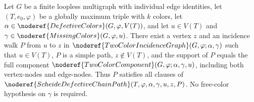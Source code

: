 \begin{helper}
Let $G$ be a finite loopless multigraph with individual edge identities,
let $(T,e_0,\varphi)$ be a globally maximum triple with $k$ colors,
let $\alpha\in\noderef{DefectiveColors}(G,\varphi,V(T))$, and let
$u\in V(T)$ and $\gamma\in\noderef{MissingColors}(G,\varphi,u)$.
There exist a vertex $z$ and an incidence walk $P$ from $u$ to $z$
in $\noderef{TwoColorIncidenceGraph}(G,\varphi;\alpha,\gamma)$ such that
$u\in V(T)$, $P$ is a simple path, $z\notin V(T)$, and the support
of $P$ equals the full component
$\noderef{TwoColorComponent}(G,\varphi;\alpha,\gamma,u)$, including
both vertex-nodes and edge-nodes.  Thus $P$ satisfies all clauses of
$\noderef{ScheideDefectiveChainPath}(T,\varphi,\alpha,\gamma,u,z,P)$.
No free-color hypothesis on $\gamma$ is required.
\end{helper}
